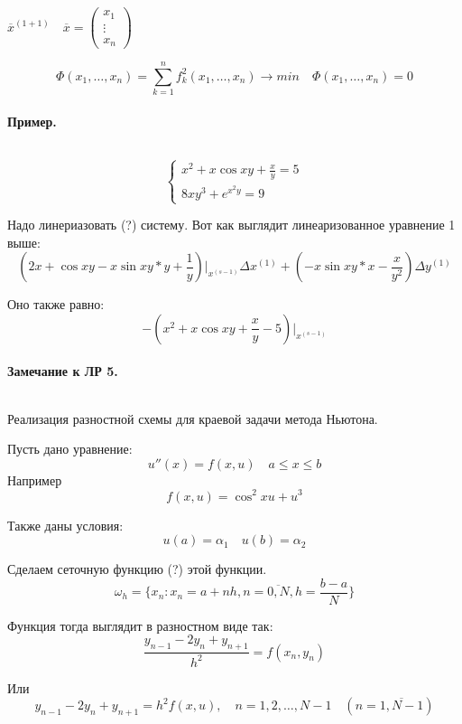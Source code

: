$\overline{x}^{(1+1)} \quad \overline{x} = \begin{pmatrix} x_1\\ \vdots \\ x_{n} \end{pmatrix} $


\medskip

\[
\Phi(x_1,\ldots,x_{n}) = \sum\limits_{k=1}^{n}f_k^{2}(x_1,\ldots,x_{n}) \to min \quad \Phi(x_1,\ldots,
x_{n}) = 0 
\] 

\paragraph*{Пример.} ${}$ \newline

\[
\begin{cases}
    x^{2} + x\cos xy + \frac{x}{y} = 5\\
    8xy^{3} + e^{x^{2}y} = 9
\end{cases}
\] 

Надо линериазовать (?) систему. Вот как выглядит линеаризованное уравнение 1 выше:
\[
    \left(2x + \cos xy - x\sin xy * y + \frac{1}{y}\right)\bigg|_{x^{(s-1)}} \Delta x^{(1)} + 
    \left(-x \sin xy * x - \frac{x}{y^2}\right) \Delta y^{(1)}
\] 

Оно также равно:
\[
-\left(x^{2} + x \cos xy + \frac{x}{y} - 5\right)\bigg|_{x^{(s-1)}}
\] 

\paragraph*{Замечание к ЛР 5.} ${}$ \newline

Реализация разностной схемы для краевой задачи метода Ньютона.

\medskip

Пусть дано уравнение:
\[
u''(x) = f(x,u) \quad a \le x \le b
\] 
Например
\begin{equation}
f(x,u) = \cos^{2} xu + u^{3}
\end{equation}

Также даны условия:
\[
u(a) = \alpha_1 \quad u(b) = \alpha_2
\] 

Сделаем сеточную функцию (?) этой функции.
\[
\omega_h = \{x_{n}: x_{n}=a + nh, n = \overline{0,N}, h = \frac{b-a}{N}\} 
\] 

Функция тогда выглядит в разностном виде так:
\[
\frac{y_{n-1} - 2y_{n} + y_{n+1}}{h^2} = f(x_{n},y_{n})
\]

Или
\begin{equation}
y_{n-1} - 2y_{n} + y_{n+1} = h^{2} f(x,u), \quad n = 1,2, \ldots, N-1 \quad (n = \overline{1, N-1})
\end{equation}

